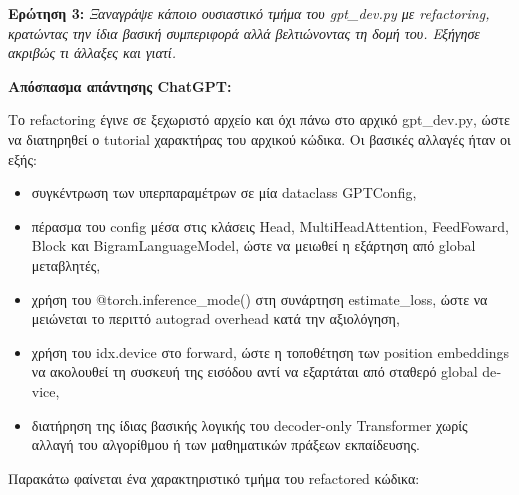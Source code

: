 \documentclass[11pt,a4paper]{article}
\begin{document}
\textbf{Ερώτηση 3:} \emph{Ξαναγράψε κάποιο ουσιαστικό τμήμα του \textlatin{gpt\_dev.py} με \textlatin{refactoring},
κρατώντας την ίδια βασική συμπεριφορά αλλά βελτιώνοντας τη δομή του. Εξήγησε ακριβώς τι άλλαξες και γιατί.}

\textbf{Απόσπασμα απάντησης \textlatin{ChatGPT}:}

Το \textlatin{refactoring} έγινε σε ξεχωριστό αρχείο και όχι πάνω στο αρχικό \textlatin{gpt\_dev.py}, ώστε να
διατηρηθεί ο \textlatin{tutorial} χαρακτήρας του αρχικού κώδικα. Οι βασικές αλλαγές ήταν οι εξής:
\begin{itemize}
  \item συγκέντρωση των υπερπαραμέτρων σε μία \textlatin{dataclass} \textlatin{GPTConfig},
  \item πέρασμα του \textlatin{config} μέσα στις κλάσεις \textlatin{Head}, \textlatin{MultiHeadAttention},
  \textlatin{FeedFoward}, \textlatin{Block} και \textlatin{BigramLanguageModel}, ώστε να μειωθεί η εξάρτηση από
  global μεταβλητές,
  \item χρήση του \textlatin{@torch.inference\_mode()} στη συνάρτηση \textlatin{estimate\_loss}, ώστε να
  μειώνεται το περιττό \textlatin{autograd overhead} κατά την αξιολόγηση,
  \item χρήση του \textlatin{idx.device} στο \textlatin{forward}, ώστε η τοποθέτηση των \textlatin{position embeddings}
  να ακολουθεί τη συσκευή της εισόδου αντί να εξαρτάται από σταθερό global \textlatin{device},
  \item διατήρηση της ίδιας βασικής λογικής του \textlatin{decoder-only Transformer} χωρίς αλλαγή του αλγορίθμου
  ή των μαθηματικών πράξεων εκπαίδευσης.
\end{itemize}

Παρακάτω φαίνεται ένα χαρακτηριστικό τμήμα του \textlatin{refactored} κώδικα:
\end{document}
